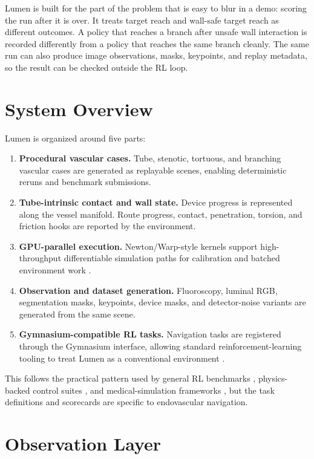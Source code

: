 \documentclass[11pt]{article}
\begin{document}
Lumen is built for the part of the problem that is easy to blur in a demo: scoring the run after it is over. It treats target reach and wall-safe target reach as different outcomes. A policy that reaches a branch after unsafe wall interaction is recorded differently from a policy that reaches the same branch cleanly. The same run can also produce image observations, masks, keypoints, and replay metadata, so the result can be checked outside the RL loop.

\section{System Overview}

Lumen is organized around five parts:

\begin{enumerate}
  \item \textbf{Procedural vascular cases.} Tube, stenotic, tortuous, and branching vascular cases are generated as replayable scenes, enabling deterministic reruns and benchmark submissions.
  \item \textbf{Tube-intrinsic contact and wall state.} Device progress is represented along the vessel manifold. Route progress, contact, penetration, torsion, and friction hooks are reported by the environment.
  \item \textbf{GPU-parallel execution.} Newton/Warp-style kernels support high-throughput differentiable simulation paths for calibration and batched environment work \cite{nvidiawarp}.
  \item \textbf{Observation and dataset generation.} Fluoroscopy, luminal RGB, segmentation masks, keypoints, device masks, and detector-noise variants are generated from the same scene.
  \item \textbf{Gymnasium-compatible RL tasks.} Navigation tasks are registered through the Gymnasium interface, allowing standard reinforcement-learning tooling to treat Lumen as a conventional environment \cite{gym2016,gymnasium2024}.
\end{enumerate}

This follows the practical pattern used by general RL benchmarks \cite{gym2016,gymnasium2024}, physics-backed control suites \cite{todorov2012mujoco,coumans2021bullet}, and medical-simulation frameworks \cite{allard2007sofa,updegrove2017simvascular,izzo2018vmtk}, but the task definitions and scorecards are specific to endovascular navigation.

\section{Observation Layer}
\end{document}
